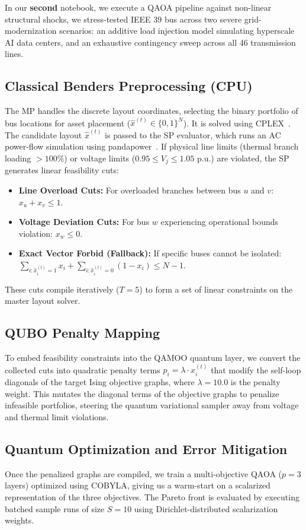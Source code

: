 \documentclass[11pt]{article}
\begin{document}
In our \textbf{second} notebook, we execute a QAOA pipeline against non-linear structural shocks, we stress-tested  IEEE 39 bus across two severe grid-modernization scenarios: an additive load injection model simulating hyperscale AI data centers, and an exhaustive contingency sweep across all 46 transmission lines.

\subsection{Classical Benders Preprocessing (CPU)}
The MP handles the discrete layout coordinates, selecting the binary portfolio of bus locations for asset placement ($\hat{x}^{(t)} \in \{0,1\}^N$). It is solved using CPLEX~\cite{cplex2024}. The candidate layout $\hat{x}^{(t)}$ is passed to the SP evaluator, which runs an AC power-flow simulation using pandapower~\cite{pandapower2018}. If physical line limits (thermal branch loading $> 100\%$) or voltage limits ($0.95 \le V_j \le 1.05$ p.u.) are violated, the SP generates linear feasibility cuts:
\begin{itemize}[leftmargin=*,noitemsep,topsep=0pt]
  \item \textbf{Line Overload Cuts:} For overloaded branches between bus $u$ and $v$: $x_u + x_v \le 1$.
  \item \textbf{Voltage Deviation Cuts:} For bus $w$ experiencing operational bounds violation: $x_w \le 0$.
  \item \textbf{Exact Vector Forbid (Fallback):} If specific buses cannot be isolated: $\sum_{i: \hat{x}_i^{(t)}=1} x_i + \sum_{i: \hat{x}_i^{(t)}=0} (1 - x_i) \le N - 1$.
\end{itemize}
These cuts compile iteratively ($T=5$) to form a set of linear constraints on the master layout solver.

\subsection{QUBO Penalty Mapping}
To embed feasibility constraints into the QAMOO quantum layer, we convert the collected cuts into quadratic penalty terms $p_i = \lambda \cdot \hat{x}_i^{(t)}$ that modify the self-loop diagonals of the target Ising objective graphs, where $\lambda = 10.0$ is the penalty weight. This mutates the diagonal terms of the objective graphs to penalize infeasible portfolios, steering the quantum variational sampler away from voltage and thermal limit violations.

\subsection{Quantum Optimization and Error Mitigation}
Once the penalized graphs are compiled, we train a multi-objective QAOA ($p=3$ layers) optimized using COBYLA, giving us a warm-start on a scalarized representation of the three objectives. The Pareto front is evaluated by executing batched sample runs of size $S=10$ using Dirichlet-distributed scalarization weights. 
\end{document}
